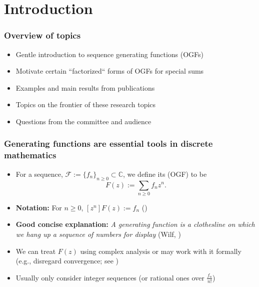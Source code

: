 

\section{Introduction} 

\begin{frame}
\frametitle{Overview of topics}
\begin{itemize} 

\item Gentle introduction to sequence generating functions (OGFs) 
\pause\item Motivate certain ``factorized`` forms of OGFs for special sums 
\pause\item Examples and main results from publications
\pause\item Topics on the frontier of these research topics 
\pause\item Questions from the committee and audience

\end{itemize}

\end{frame}

\begin{frame}
\frametitle{Generating functions are essential tools in discrete mathematics}
\begin{itemize} 

\item For a sequence, $\mathcal{F} := \{f_n\}_{n \geq 0} \subset \mathbb{C}$, we define its 
       (OGF) to be 
      \[
      F(z) := \sum_{n \geq 0} f_n z^n.
      \]
\pause\item \textbf{Notation:} For $n \geq 0$, $[z^n] F(z) := f_n$ () 
\pause\item \textbf{Good concise explanation:} 
      \emph{A generating function is a clothesline on which we hang up a sequence of numbers for display} 
      (Wilf, \cite{GFOLOGY})
\pause\item We can treat $F(z)$ using complex analysis or 
      may work with it formally (e.g., disregard convergence; see \cite{REZNICK-STERN-NOTES})
\pause\item Usually only consider integer sequences (or rational ones over $\frac{f_n}{n!}$)

\end{itemize}

\end{frame}

